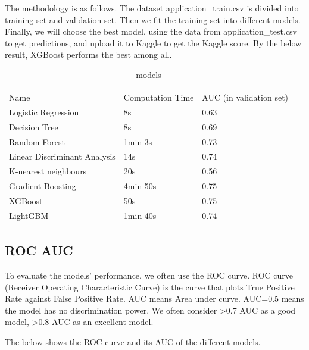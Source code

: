 \documentclass{article}
\begin{document}
\newpage
			
The methodology is as follows. The dataset application\_train.csv is divided into training set and validation set. Then we fit the training set into different models. Finally, we will choose the best model, using the data from application\_test.csv to get predictions, and upload it to Kaggle to get the Kaggle score. By the below result, XGBoost performs the best among all.

\mbox{}

\begin{table}[H]
  \caption{models}
  \label{sample-table}
  \centering
  \begin{tabular}{lll}
    \toprule
    \multicolumn{2}{c}{}                   \\
    Name   &  Computation Time & AUC (in validation set)   \\
    \midrule
    Logistic Regression & 8s & 0.63   \\
    Decision Tree & 8s & 0.69  \\
    Random Forest & 1min 3s & 0.73 \\
    Linear Discriminant Analysis & 14s & 0.74 \\
    K-nearest neighbours & 20s & 0.56 \\
    Gradient Boosting & 4min 50s & 0.75 \\
    XGBoost & 50s & 0.75 \\
    LightGBM & 1min 40s & 0.74 \\
    \bottomrule
  \end{tabular}
\end{table}

\mbox{}

\subsection{ROC AUC}

To evaluate the models’ performance, we often use the ROC curve. ROC curve (Receiver Operating Characteristic Curve) is the curve that plots True Positive Rate against False Positive Rate. AUC means Area under curve. AUC=0.5 means the model has no discrimination power. We often consider >0.7 AUC as a good model, >0.8 AUC as an excellent model.		

The below shows the ROC curve and its AUC of the different models.
\end{document}
